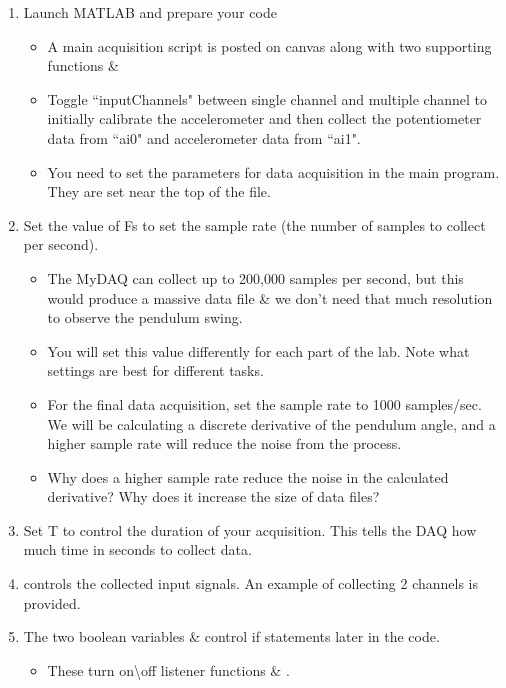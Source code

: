 \documentclass{article} %
\begin{document}
\begin{enumerate}
    \item Launch MATLAB and prepare your code
    \begin{itemize}
        \item A main acquisition script  is posted on canvas along with two supporting functions  \& 
        \item Toggle ``inputChannels" between single channel and multiple channel to initially calibrate the accelerometer and then collect the potentiometer data from ``ai0" and accelerometer data from ``ai1".
        \item You need to set the parameters for data acquisition in the main program. They are set near the top of the file.
    \end{itemize} 
    \item Set the value of Fs to set the sample rate (the number of samples to collect per second). 
    \begin{itemize}
        \item The MyDAQ can collect up to 200,000 samples per second, but this would produce a massive data file \& we don't need that much resolution to observe the pendulum swing. 
        \item You will set this value differently for each part of the lab. Note what settings are best for different tasks. 
        \item For the final data acquisition, set the sample rate to 1000 samples/sec. We will be calculating a discrete derivative of the pendulum angle, and a higher sample rate will reduce the noise from the process.
        \item [\textbf{Q}] Why does a higher sample rate reduce the noise in the calculated derivative? Why does it increase the size of data files?
    \end{itemize}
    \item Set T to control the duration of your acquisition. This tells the DAQ how much time in seconds to collect data.
    \item {} controls the collected input signals. An example of collecting 2 channels is provided.
    \item The two boolean variables  \&  control if statements later in the code.
    \begin{itemize}
        \item These turn on\textbackslash off listener functions  \& . 

\end{itemize}
\end{enumerate}
\end{document}
